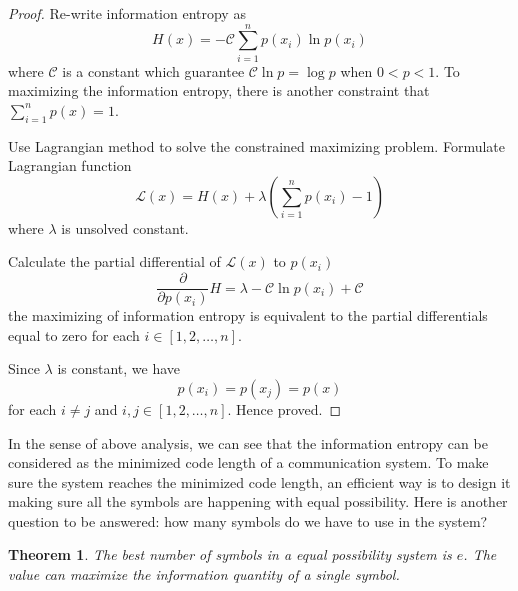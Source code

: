 \documentclass[a4paper]{article}
\newtheorem{theorem}{Theorem}[section]
\begin{document}
\begin{proof}
    Re-write information entropy as
    \begin{equation*}
        H(x) = - \mathcal{C} \sum_{i=1}^{n} p(x_{i}) \ln{p(x_{i})}
    \end{equation*}
    where $\mathcal{C}$ is a constant which guarantee $\mathcal{C} \ln{p} = \log{p}$ when $0<p<1$.
    To maximizing the information entropy, there is another constraint that $\sum_{i=1}^{n} p(x) = 1$.

    Use Lagrangian method to solve the constrained maximizing problem.
    Formulate Lagrangian function
    \begin{equation*}
        \mathcal{L}(x) = H(x) + \lambda(\sum_{i=1}^{n} p(x_{i}) - 1)
    \end{equation*}
    where $\lambda$ is unsolved constant.

    Calculate the partial differential of $\mathcal{L}(x)$ to $p(x_{i})$
    \begin{equation*}
        \frac{\partial}{\partial{p(x_{i})}} {H} = \lambda - \mathcal{C} \ln{p(x_{i})} + \mathcal{C}
    \end{equation*}
    the maximizing of information entropy is equivalent to the partial differentials equal to zero for each $i \in [1, 2, \dots, n]$.

    Since $\lambda$ is constant, we have
    \begin{equation*}
        p(x_{i}) = p(x_{j}) = p(x)
    \end{equation*}
    for each $i \neq j$ and $i, j \in [1, 2, \dots, n]$.
    Hence proved.
\end{proof}

In the sense of above analysis, we can see that the information entropy can be considered as the minimized code length of a communication system.
To make sure the system reaches the minimized code length, an efficient way is to design it making sure all the symbols are happening with equal possibility.
Here is another question to be answered: how many symbols do we have to use in the system?

\begin{theorem}
    The best number of symbols in a equal possibility system is $e$.
    The value can maximize the information quantity of a single symbol.
\end{theorem}
\end{document}
